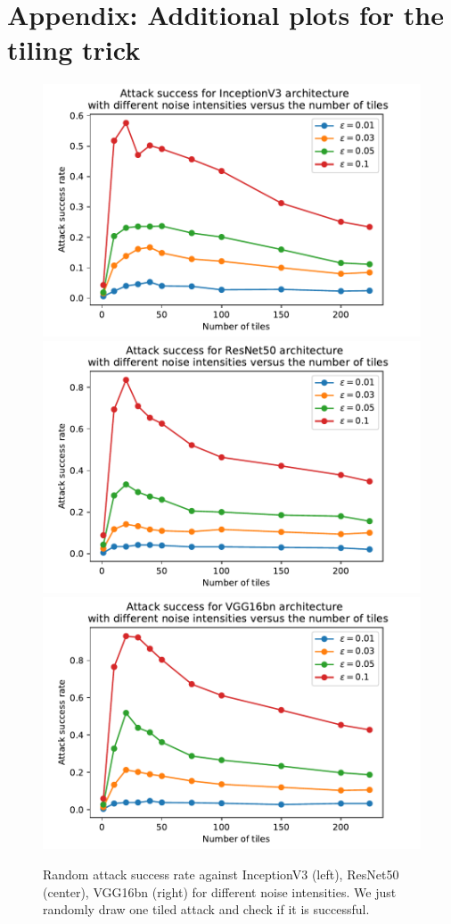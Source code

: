 \section{Appendix: Additional plots for the tiling trick}
\label{tilsup}
\begin{figure}[htb]
\centering
\includegraphics[width=.3\textwidth]{sections/appendix/arxiv_dfo/images/randnoise_inception.pdf}
\includegraphics[width=.3\textwidth]{sections/appendix/arxiv_dfo/images/randnoise_resnet.pdf}
\includegraphics[width=.3\textwidth]{sections/appendix/arxiv_dfo/images/randnoise_vgg.pdf}\\
\caption{\label{til1}Random attack success rate against InceptionV3 (left), ResNet50 (center), VGG16bn (right) for different noise intensities. We just randomly draw one tiled attack and check if it is successful.}
\end{figure}

